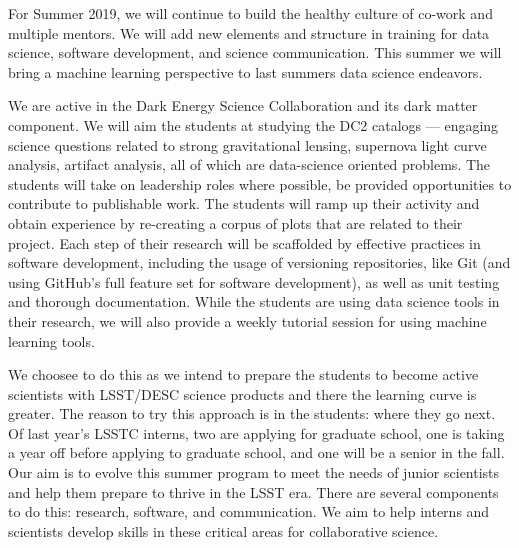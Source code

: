 For Summer 2019, we will continue to build the healthy culture of co-work and multiple mentors. 
We will add new elements and structure in training for data science, software development, and science communication.
This summer we will bring a machine learning perspective to last summers
data science endeavors. 

\newpage

We are active in the Dark Energy Science Collaboration and its dark matter component.
We will aim the students at studying the DC2 catalogs --- engaging science questions related to strong gravitational lensing, supernova light curve analysis, artifact analysis, all of which are data-science oriented problems. 
The students will take on leadership roles where possible, be provided opportunities to contribute to publishable work.
The students will ramp up their activity and obtain experience by re-creating a corpus of plots that are related to their project.
Each step of their research will be scaffolded by effective practices in software development, including the usage of versioning repositories, like Git (and using GitHub's full feature set for software development), as well as unit testing and thorough documentation.
While the students are using data science tools in their research, we will also provide a weekly tutorial session for using machine learning tools.




We choosee to do this
as we intend to prepare the students to become active scientists
with LSST/DESC science products and there the learning curve is greater.
The reason to try this approach is in the students: where they go next.
Of last year's LSSTC interns, two are applying for graduate school,
one is taking a year off before applying to graduate school, and one
will be a senior in the fall.
Our aim is to evolve this summer program to meet the needs of junior scientists and help them prepare to thrive in the LSST era. 
There are several components to do this: research, software, and communication. We aim to help interns and scientists develop skills in these critical areas for collaborative science.


